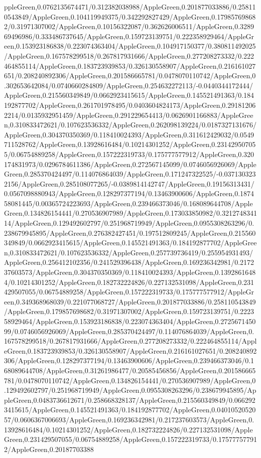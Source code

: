 {\begin{tikzternal}
{ppleGreen,0.0762135674471/0.312382038988/AppleGreen,0.201877033886/0.258110543849/AppleGreen,0.104119949375/0.342292827429/AppleGreen,0.179857698682/0.31971307002/AppleGreen,0.10156322087/0.362626006511/AppleGreen,0.328969496986/0.333486737645/AppleGreen,0.159723139751/0.222358929464/AppleGreen,0.153923186838/0.223074363404/AppleGreen,0.104917150377/0.380811492025/AppleGreen,0.167578299518/0.267817931666/AppleGreen,0.277208273332/0.222464855114/AppleGreen,0.183723939853/0.326130558907/AppleGreen,0.216161027651/0.208240892306/AppleGreen,0.201586665781/0.0478070110742/AppleGreen,0.302653642084/0.0740660284809/AppleGreen,0.254632272113/-0.0440344172444/AppleGreen,0.215560349849/0.0662923415615/AppleGreen,0.145521491363/0.184192877702/AppleGreen,0.261701978495/0.0403604824173/AppleGreen,0.291812062214/0.0135932951459/AppleGreen,0.291229654413/0.0626901166883/AppleGreen,0.310833472621/0.107623536332/AppleGreen,0.262098139224/0.0187327131676/AppleGreen,0.304370350369/0.118410024393/AppleGreen,0.311612429032/0.0549711528762/AppleGreen,0.13928616484/0.10214301252/AppleGreen,0.231429507055/0.06754889258/AppleGreen,0.157222319733/0.175777577912/AppleGreen,0.320174831973/0.0296784611386/AppleGreen,0.272567145099/0.0746056926069/AppleGreen,0.285370424497/0.114076864039/AppleGreen,0.171247322525/-0.0371303232156/AppleGreen,0.285108077265/-0.0389814142747/AppleGreen,0.19156313431/0.0567098880943/AppleGreen,0.128297377194/0.13463900606/AppleGreen,0.187458081445/0.00365724223693/AppleGreen,0.239466373046/0.168089644708/AppleGreen,0.134826154441/0.270536907989/AppleGreen,0.173033850982/0.321274834114/AppleGreen,0.129492602797/0.251968719949/AppleGreen,0.0955308263296/0.238679945895/AppleGreen,0.276382427451/0.197512809245/AppleGreen,0.215560349849/0.0662923415615/AppleGreen,0.145521491363/0.184192877702/AppleGreen,0.310833472621/0.107623536332/AppleGreen,0.257739736419/0.255954931493/AppleGreen,0.256412102356/0.241529396438/AppleGreen,0.169236342981/0.217237603573/AppleGreen,0.304370350369/0.118410024393/AppleGreen,0.13928616484/0.10214301252/AppleGreen,0.182732224826/0.227132531098/AppleGreen,0.231429507055/0.06754889258/AppleGreen,0.157222319733/0.175777577912/AppleGreen,0.349368968039/0.221077068727/AppleGreen,0.201877033886/0.258110543849/AppleGreen,0.179857698682/0.31971307002/AppleGreen,0.159723139751/0.222358929464/AppleGreen,0.153923186838/0.223074363404/AppleGreen,0.272567145099/0.0746056926069/AppleGreen,0.285370424497/0.114076864039/AppleGreen,0.167578299518/0.267817931666/AppleGreen,0.277208273332/0.222464855114/AppleGreen,0.183723939853/0.326130558907/AppleGreen,0.216161027651/0.208240892306/AppleGreen,0.128297377194/0.13463900606/AppleGreen,0.239466373046/0.168089644708/AppleGreen,0.31261986477/0.20585456856/AppleGreen,0.201586665781/0.0478070110742/AppleGreen,0.134826154441/0.270536907989/AppleGreen,0.129492602797/0.251968719949/AppleGreen,0.0955308263296/0.238679945895/AppleGreen,0.0483736612671/0.258668328137/AppleGreen,0.215560349849/0.0662923415615/AppleGreen,0.145521491363/0.184192877702/AppleGreen,0.0401052052057/0.0606367006693/AppleGreen,0.169236342981/0.217237603573/AppleGreen,0.13928616484/0.10214301252/AppleGreen,0.182732224826/0.227132531098/AppleGreen,0.231429507055/0.06754889258/AppleGreen,0.157222319733/0.175777577912/AppleGreen,0.20187703388}
\end{tikzternal}}
